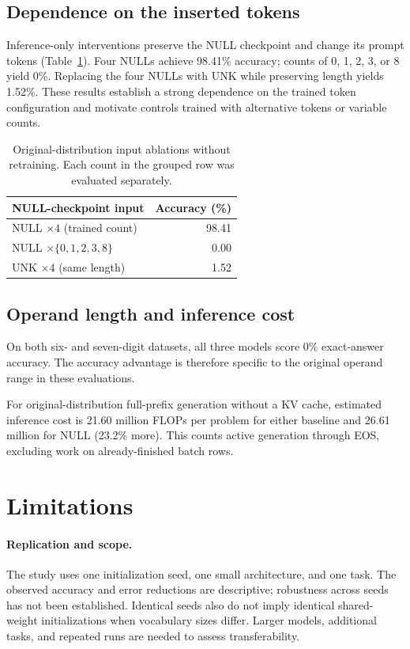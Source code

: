 \documentclass[10pt,twocolumn,letterpaper]{article}
\begin{document}
\subsection{Dependence on the inserted tokens}
Inference-only interventions preserve the NULL checkpoint and change its
prompt tokens (Table~\ref{tab:ablation}). Four NULLs achieve 98.41\% accuracy;
counts of 0, 1, 2, 3, or 8 yield 0\%. Replacing the four NULLs with UNK while
preserving length yields 1.52\%. These results establish a strong dependence
on the trained token configuration and motivate controls trained with
alternative tokens or variable counts.

\begin{table}[t]
\centering\small
\setlength{\tabcolsep}{8pt}
\begin{tabular}{lr}
\toprule
NULL-checkpoint input & Accuracy (\%)\\
\midrule
NULL $\times4$ (trained count) & 98.41\\
NULL $\times\{0,1,2,3,8\}$ & 0.00\\
UNK $\times4$ (same length) & 1.52\\
\bottomrule
\end{tabular}
\caption{Original-distribution input ablations without retraining.
Each count in the grouped row was evaluated separately.}\label{tab:ablation}
\end{table}

\subsection{Operand length and inference cost}
On both six- and seven-digit datasets, all three models score 0\% exact-answer
accuracy. The accuracy advantage is therefore specific to the original operand
range in these evaluations.

For original-distribution full-prefix generation without a KV cache, estimated
inference cost is 21.60 million FLOPs per problem for either baseline and
26.61 million for NULL (23.2\% more). This counts active generation through EOS,
excluding work on already-finished batch rows.

\section{Limitations}
\paragraph{Replication and scope.}
The study uses one initialization seed, one small architecture, and one task.
The observed accuracy and error reductions are descriptive; robustness across
seeds has not been established. Identical seeds also do not imply identical
shared-weight initializations when vocabulary sizes differ. Larger models,
additional tasks, and repeated runs are needed to assess transferability.
\end{document}
